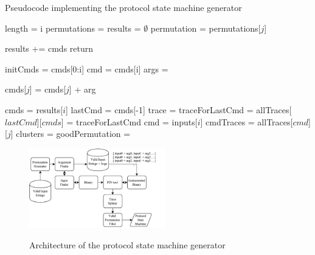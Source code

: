 \documentclass{sig-alternate-05-2015}
\begin{document}
\begin{algorithm}
\caption{Pseudocode implementing the protocol state machine generator}
\label{psmcode}
\begin{algorithmic}[1]
\State length = i
\State permutations = 
\State results = $\emptyset$
\State permutation = permutations[$j$]
\State {}
\EndFor
\State {}
\EndFor
\EndProcedure

\State results += cmds
\State return
\EndIf

\State initCmds = cmds[0:i]
\State cmd = cmds[i]
\State args = 

\State cmds[$j$] = cmds[$j$] + arg
\State {}
\EndFor
\EndProcedure

\State cmds = results[$i$]
\State lastCmd = cmds[-1]
\State trace = 
\State traceForLastCmd = 
\State allTraces[$lastCmd$][$cmds$] = traceForLastCmd
\EndFor
{}
\State cmd = inputs[$i$]
\State cmdTraces = allTraces[$cmd$][$j$]
\State clusters = 
\State goodPermutation = 
\EndFor
\EndFor
\EndProcedure
\end{algorithmic}
\end{algorithm}

\begin{figure}[h!]
\caption{Architecture of the protocol state machine generator}
\centering
\includegraphics[width=0.53\textwidth]{psmarch.pdf}
\label{fig:psm_arch}
\end{figure}
\end{document}
